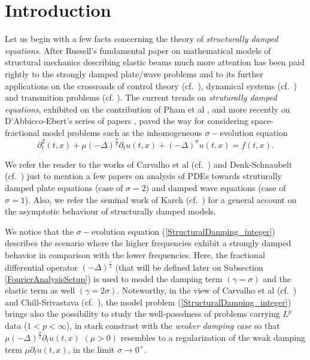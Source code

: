 \documentclass{amsart}
\theoremstyle{definition}
\theoremstyle{remark}
\numberwithin{equation}{section}
\begin{document}



\maketitle

\tableofcontents

\section{Introduction}


Let us begin with a few facts concerning the theory of {\it structurally damped equations}.
After Russell's fundamental paper \cite{Russell86} on mathematical models of structural mechanics describing elastic beams much more attention has been paid rightly to the strongly damped plate/wave problems and to its further applications on the crossroads of control theory (cf.~\cite{AN10}), dynamical systems (cf.~\cite{Wang14}) and transmition problems (cf.
\cite{MDenkMK19}).
The current trends on {\it struturally damped equations}, exhibited on the contribution of Pham et al \cite{PMR15}, and more recently on D'Abbicco-Ebert's series of papers \cite{AE17,AE_21,AE22}, paved the way for considering space-fractional model problems such as the {inhomogeneous} $\sigma-$evolution equation
\begin{equation} 
	\label{StructuralDamping_integer}
	\partial_t^2 (t,x)+\mu (-\Delta)^{\frac{\sigma}{2}} \partial_t u(t,x)+(-\Delta)^\sigma u(t,x)=f(t,x).
\end{equation}

We refer the reader to the works of Carvalho et al (cf.~\cite{CCD08}) and Denk-Schnaubelt (cf.~\cite{DS15}) just to mention a few papers on analysis of PDEs towards struturally damped plate equations (case of $\sigma=2$) and damped wave equations (case of $\sigma=1$). Also, we refer the seminal work of Karch (cf.~\cite{karch2000selfsimilar}) for a general account on the asymptotic behaviour of structurally damped models.

We notice that the $\sigma-$evolution equation (\ref{StructuralDamping_integer}) describes the scenario where the higher frequencies exhibit a strongly damped behavior in comparison with the lower frequencies. Here, the fractional differential operator $(-\Delta)^{\frac{\gamma}{2}}$ (that will be defined later on Subsection \ref{FourierAnalysisSetup}) is used to model the damping term $(\gamma=\sigma)$ and the elastic term as well $(\gamma=2\sigma)$. Noteworthy, in the view of Carvalho et al (cf.~\cite{CCD08}) and Chill-Srivastava (cf.~\cite{CS05}), the model problem (\ref{StructuralDamping_integer}) brings also the possibility to study the well-posedness of problems carrying $L^p$ data ($1<p<\infty$), in stark constrast with the {\it weaker damping case} so that $\mu (-\Delta)^{\frac{\sigma}{2}} \partial_t u(t,x)$ $(\mu>0)$ resembles to a regularization of the weak damping term $\mu \partial_t u(t,x)$, in the limit $\sigma \rightarrow 0^+$.
\end{document}
